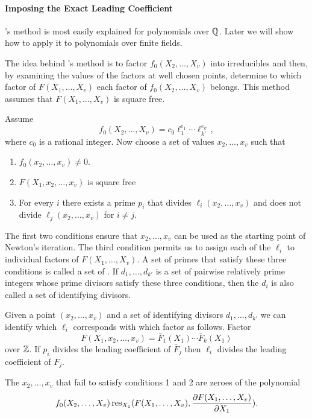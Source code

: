 \paragraph{Imposing the Exact Leading Coefficient}

{\WangP}'s method \cite{Wang78} is most easily explained for
polynomials over $\mathbb{Q}$.  Later we will show how to apply it to
polynomials over finite fields.

The idea behind {\WangP}'s method is to factor $f_0(X_2, \ldots, X_v)$
into irreducibles and then, by examining the values of the factors at
well chosen points, determine to which factor of $F(X_1, \ldots, X_v)$
each factor of $f_0(X_2, \ldots, X_v)$ belongs.  This method  assumes
that $F(X_1, \ldots, X_v)$ is square free.

Assume 
\[
f_0(X_2, \ldots, X_v) = c_0 \ell_1^{e_1} \cdots \ell_{k'}^{e_{k'}},
\]
where $c_0$ is a rational integer. 
Now choose a set of values $x_2, \ldots, x_v$ such that
\begin{enumerate}
\item $f_0(x_2, \ldots, x_v) \not= 0$.
\item $F(X_1, x_2, \ldots, x_v)$ is square free
\item For every $i$ there exists a prime $p_i$ that divides
$\ell_i(x_2, \ldots, x_v)$ and does not divide $\ell_j(x_2, \ldots,
x_v)$ for $i \not=j$.
\end{enumerate}

The first two conditions ensure that $x_2, \ldots, x_v$ can be used as
the starting point of Newton's iteration.  The third condition permits
us to assign each of the $\ell_i$ to individual factors of $F(X_1,
\ldots, X_v)$.  A set of primes that satisfy these three conditions is
called a set of .  If $d_1, \ldots, d_{k'}$
is a set of pairwise relatively prime integers whose prime divisors
satisfy these three conditions, then the $d_i$ is also called a set of
identifying divisors.

Given a point $(x_2, \ldots, x_v)$ and a set of identifying divisors
$d_1, \ldots, d_{k'}$ we can identify which $\ell_i$ corresponds with
which factor as follows.  Factor
\[
F(X_1, x_2, \ldots, x_v) = \bar{F}_1(X_1) \cdots \bar{F}_k(X_1)
\]
over $\mathbb{Z}$.  If $p_i$ divides the leading coefficient of $\bar{F}_j$
then $\ell_i$ divides the leading coefficient of $F_j$.  


The $x_2, \ldots, x_v$ that fail to satisfy conditions 1 and 2 are
zeroes of the polynomial
\[
f_0(X_2, \ldots, X_v) \mathop{\rm res}\nolimits_{X_1}(F(X_1, \ldots, X_v), \frac{\partial
F(X_1, \ldots, X_v)}{\partial X_1}).
\]

